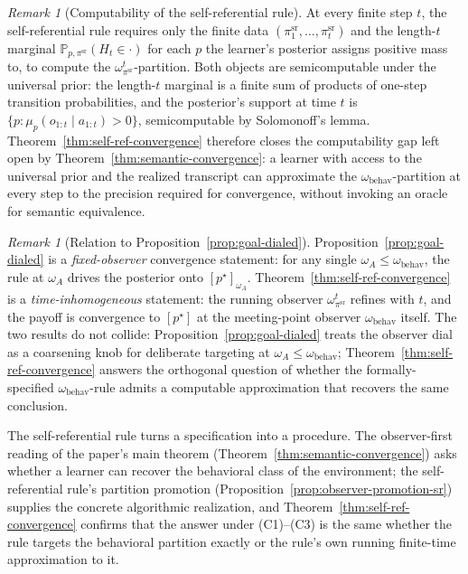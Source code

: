 \documentclass[11pt]{article}
\theoremstyle{definition}
\theoremstyle{remark}
\newtheorem{remark}[theorem]{Remark}
\newcommand{\Prob}{\mathbb{P}}
\begin{document}
\begin{remark}[Computability of the self-referential rule]
\label{rem:self-ref-computability}
At every finite step $t$, the self-referential rule requires only the finite data $(\pi^{\mathrm{sr}}_1,\dots,\pi^{\mathrm{sr}}_t)$ and the length-$t$ marginal $\Prob_{p,\pi^{\mathrm{sr}}}(H_t\in\cdot)$ for each $p$ the learner's posterior assigns positive mass to, to compute the $\omega_{\pi^{\mathrm{sr}}}^t$-partition. Both objects are semicomputable under the universal prior: the length-$t$ marginal is a finite sum of products of one-step transition probabilities, and the posterior's support at time $t$ is $\{p:\mu_p(o_{1:t}\mid a_{1:t})>0\}$, semicomputable by Solomonoff's lemma. Theorem~\ref{thm:self-ref-convergence} therefore closes the computability gap left open by Theorem~\ref{thm:semantic-convergence}: a learner with access to the universal prior and the realized transcript can approximate the $\omega_{\mathrm{behav}}$-partition at every step to the precision required for convergence, without invoking an oracle for semantic equivalence.
\end{remark}

\begin{remark}[Relation to Proposition~\ref{prop:goal-dialed}]
\label{rem:self-ref-vs-goal-dialed}
Proposition~\ref{prop:goal-dialed} is a \emph{fixed-observer} convergence statement: for any single $\omega_A\le\omega_{\mathrm{behav}}$, the rule at $\omega_A$ drives the posterior onto $[p^\star]_{\omega_A}$. Theorem~\ref{thm:self-ref-convergence} is a \emph{time-inhomogeneous} statement: the running observer $\omega_{\pi^{\mathrm{sr}}}^t$ refines with $t$, and the payoff is convergence to $[p^\star]$ at the meeting-point observer $\omega_{\mathrm{behav}}$ itself. The two results do not collide: Proposition~\ref{prop:goal-dialed} treats the observer dial as a coarsening knob for deliberate targeting at $\omega_A\le\omega_{\mathrm{behav}}$; Theorem~\ref{thm:self-ref-convergence} answers the orthogonal question of whether the formally-specified $\omega_{\mathrm{behav}}$-rule admits a computable approximation that recovers the same conclusion.
\end{remark}

The self-referential rule turns a specification into a procedure. The observer-first reading of the paper's main theorem (Theorem~\ref{thm:semantic-convergence}) asks whether a learner can recover the behavioral class of the environment; the self-referential rule's partition promotion (Proposition~\ref{prop:observer-promotion-sr}) supplies the concrete algorithmic realization, and Theorem~\ref{thm:self-ref-convergence} confirms that the answer under (C1)--(C3) is the same whether the rule targets the behavioral partition exactly or the rule's own running finite-time approximation to it.
\end{document}
